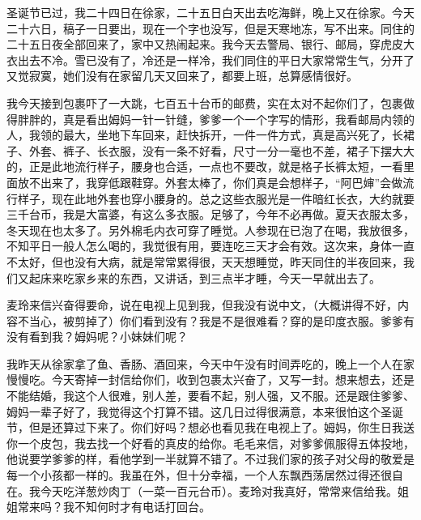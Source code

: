 \par {}
\par 圣诞节已过，我二十四日在徐家，二十五日白天出去吃海鲜，晚上又在徐家。今天二十六日，稿子一日要出，现在一个字也没写，但是天寒地冻，写不出来。同住的二十五日夜全部回来了，家中又热闹起来。我今天去警局、银行、邮局，穿虎皮大衣出去不冷。雪已没有了，冷还是一样冷，我们同住的平日大家常常生气，分开了又觉寂寞，她们没有在家留几天又回来了，都要上班，总算感情很好。
\par 我今天接到包裹吓了一大跳，七百五十台币的邮费，实在太对不起你们了，包裹做得胖胖的，真是看出姆妈一针一针缝，爹爹一个一个字写的情形，我看邮局内领的人，我领的最大，坐地下车回来，赶快拆开，一件一件方式，真是高兴死了，长裙子、外套、裤子、长衣服，没有一条不好看，尺寸一分一毫也不差，裙子下摆大大的，正是此地流行样子，腰身也合适，一点也不要改，就是格子长裤太短，一看里面放不出来了，我穿低跟鞋穿。外套太棒了，你们真是会想样子，“阿巴婶”会做流行样子，现在此地外套也穿小腰身的。总之这些衣服光是一件暗红长衣，大约就要三千台币，我是大富婆，有这么多衣服。足够了，今年不必再做。夏天衣服太多，冬天现在也太多了。另外棉毛内衣可穿了睡觉。人参现在已泡了在喝，我放很多，不知平日一般人怎么喝的，我觉很有用，要连吃三天才会有效。这次来，身体一直不太好，但也没有大病，就是常常累得很，天天想睡觉，昨天同住的半夜回来，我们又起床来吃家乡来的东西，又讲话，到三点半才睡，今天一早就出去了。
\par 麦玲来信兴奋得要命，说在电视上见到我，但我没有说中文，（大概讲得不好，内容不当心，被剪掉了）你们看到没有？我是不是很难看？穿的是印度衣服。爹爹有没有看到我？姆妈呢？小妹妹们呢？
\par 我昨天从徐家拿了鱼、香肠、酒回来，今天中午没有时间弄吃的，晚上一个人在家慢慢吃。今天寄掉一封信给你们，收到包裹太兴奋了，又写一封。想来想去，还是不能结婚，我这个人很难，别人差，要看不起，别人强，又不服。还是跟住爹爹、姆妈一辈子好了，我觉得这个打算不错。这几日过得很满意，本来很怕这个圣诞节，但是还算过下来了。你们好吗？想必也看见我在电视上了。姆妈，你生日我送你一个皮包，我去找一个好看的真皮的给你。毛毛来信，对爹爹佩服得五体投地，他说要学爹爹的样，看他学到一半就算不错了。不过我们家的孩子对父母的敬爱是每一个小孩都一样的。我虽在外，但十分幸福，一个人东飘西荡居然过得还很自在。我今天吃洋葱炒肉丁（一菜一百元台币）。麦玲对我真好，常常来信给我。姐姐常来吗？我不知何时才有电话打回台。
\par {}













